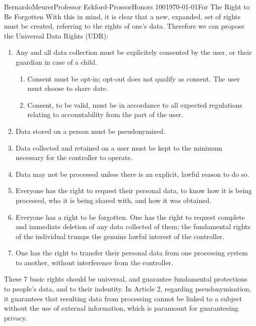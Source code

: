 \documentclass[12pt,letterpaper]{article}
\begin{document}
\begin{mla}{Bernardo}{Meurer}{Professor Eckford-Prossor}{Honors 100}{\today}{For The Right to Be Forgotten}
    With this in mind, it is clear that a new, expanded, set of rights must be created, referring to the rights of one's data. Therefore we can propose the Universal Data Rights (UDR):
\begin{enumerate}
    \item Any and all data collection must be explicitely consented by the user, or their guardian in case of a child.
        \begin{enumerate}
            \item Consent must be opt-in; opt-out does not qualify as consent. The user must choose to share date.
            \item Consent, to be valid, must be in accordance to all expected regulations relating to accountability from the part of the user.
        \end{enumerate}
    \item Data stored on a person must be pseudonymized.
    \item Data collected and retained on a user must be kept to the minimum necessary for the controller to operate.
    \item Data may not be processed unless there is an explicit, lawful reason to do so.
    \item Everyone has the right to request their personal data, to know how it is being processed, who it is being shared with, and how it was obtained.
    \item Everyone has a right to be forgotten. One has the right to request complete and immediate deletion of any data collected of them; the fundamental rights of the individual trumps the genuine lawful interest of the controller.
    \item One has the right to transfer their personal data from one processing system to another, without interference from the controller.
\end{enumerate}
These 7 basic rights should be universal, and guarantee fundamental protections to people's data, and to their indentity. In Article 2, regarding pseudonymisation, it guarantees that resulting data from processing cannot be linked to a subject without the use of external information, which is paramount for guaranteeing privacy.


\end{mla}
\end{document}
